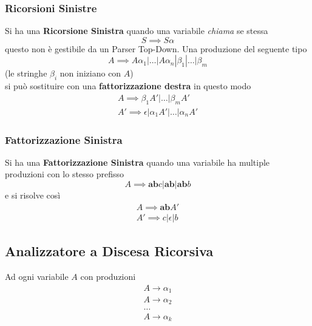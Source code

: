 \documentclass[14pt]{extarticle}
\begin{document}
\subsubsection{Ricorsioni Sinistre}
Si ha una \textbf{Ricorsione Sinistra} quando una variabile \textit{chiama} se stessa 
\begin{equation*}
    S \implies S\alpha
\end{equation*}
questo non è gestibile da un Parser Top-Down. Una produzione del seguente tipo
\begin{equation*}
    A \implies A\alpha_1|\dots|A\alpha_n|\beta_1|\dots|\beta_m
\end{equation*}
(le stringhe $\beta_i$ non iniziano con $A$)\\
si può sostituire con una \textbf{fattorizzazione destra} in questo modo
\begin{equation*}
    \begin{aligned}
        A \implies \beta_1A'|\dots|\beta_mA'\\        
        A' \implies \epsilon|\alpha_1A'|\dots|\alpha_nA'
    \end{aligned}
\end{equation*}

\subsubsection{Fattorizzazione Sinistra}
Si ha una \textbf{Fattorizzazione Sinistra} quando una variabile ha multiple produzioni con lo stesso prefisso
\begin{equation*}
    A \implies \textbf{ab}c|\textbf{ab}|\textbf{ab}b
\end{equation*}
e si risolve così
\begin{equation*}
    \begin{aligned}
        A \implies \textbf{ab}A'\\
        A' \implies c|\epsilon|b
    \end{aligned}
\end{equation*}

\subsection{Analizzatore a Discesa Ricorsiva}
Ad ogni variabile $A$ con produzioni
\begin{equation*}
    \begin{aligned}
        A \rightarrow \alpha_1\\
        A \rightarrow \alpha_2\\
        \dots\\
        A \rightarrow \alpha_k
    \end{aligned}
\end{equation*}
\end{document}
